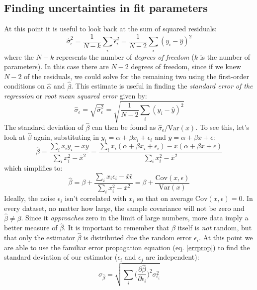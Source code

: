\subsection{Finding uncertainties in fit parameters}
At this point it is useful to look back at the sum of squared residuals:
\begin{equation}
\hat \sigma_\epsilon^2 = \frac{1}{N-k}\sum_i \hat \epsilon_i^2 =  \frac{1}{N-2}\sum_i (y_i - \hat y)^2  
\end{equation}
where the $N-k$ represents the number of \emph{degrees of freedom} ($k$ is the number of parameters). In this case there are $N-2$ degrees of freedom, since if we knew $N-2$ of the residuals, we could solve for the remaining two using the first-order conditions on $\hat \alpha$ and $\hat \beta$. This estimate is useful in finding the \emph{standard error of the regression} or \emph{root mean squared error} given by:
\begin{equation}
\hat \sigma_\epsilon = \sqrt{\hat \sigma_\epsilon^2} = \sqrt{ \frac{1}{N-2}\sum_i (y_i - \hat y)^2 }
\end{equation}
The standard deviation of  $\hat \beta$ can then be found as  $\hat \sigma_\epsilon / \mathrm{Var}(x)$. To see this, let's look at $\hat \beta$ again, substituting in $y_i = \alpha + \beta x_i + \epsilon_i$ and $\bar y = \alpha + \beta \bar x + \bar \epsilon$:
\begin{equation}
\hat \beta = \frac{\sum_i x_i y_i - \bar x \bar y}{\sum_i   x_i^2 - \bar x^2} = \frac{\sum_i x_i (\alpha + \beta x_i + \epsilon_i) - \bar x ( \alpha + \beta \bar x + \bar \epsilon)}{\sum_i   x_i^2 - \bar x^2} 
\end{equation}
which simplifies to:
\begin{equation}
\hat \beta = \beta + \frac{\sum_i x_i \epsilon_i - \bar x \bar \epsilon}{\sum_i   x_i^2 - \bar x^2}  = \beta + \frac{\mathrm{Cov}(x,\epsilon)}{\mathrm{Var}(x)}
\end{equation}
Ideally, the noise $\epsilon_i$ isn't correlated with $x_i$ so that on average $\mathrm{Cov}(x,\epsilon) = 0$.  In every dataset, no matter how large, the sample covariance will not be zero and $\hat \beta \neq \beta$. Since it \emph{approaches} zero in the limit of large numbers, more data imply a better measure of $\hat \beta$. It is important to remember that $\beta$ itself is \emph{not} random, but that only the estimator $\hat \beta$ is distributed due the random error $\epsilon_i$. At this point we are able to use the familiar error propagation equation (eq. \eqref{errprop}) to find the standard deviation of our estimator ($\epsilon_i$ and $\epsilon_j$ are independent):
\begin{equation}
\sigma_{\hat \beta} = \sqrt{\sum_i \bigg( \frac{\partial \hat \beta}{\partial \epsilon_i} \bigg )^2 \sigma_{\epsilon_i}^2}
\end{equation}

